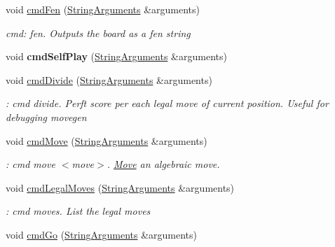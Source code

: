 \begin{DoxyCompactItemize}
void \hyperlink{classCommandEngine_ad6f3a8998e456a4efa626e32219e1406}{cmd\+Fen} (\hyperlink{structStringArguments}{String\+Arguments} \&arguments)
\begin{DoxyCompactList}\small\item\em cmd\+: fen. Outputs the board as a fen string \end{DoxyCompactList}\item 
\mbox{\label{classCommandEngine_a3c3140b31ac623d4b84611dfe954f3f0}} 
void {\bfseries cmd\+Self\+Play} (\hyperlink{structStringArguments}{String\+Arguments} \&arguments)
\item 
\mbox{\label{classCommandEngine_a1b1dfc2c6c5f0a161b68639b44798030}} 
void \hyperlink{classCommandEngine_a1b1dfc2c6c5f0a161b68639b44798030}{cmd\+Divide} (\hyperlink{structStringArguments}{String\+Arguments} \&arguments)
\begin{DoxyCompactList}\small\item\em \+: cmd divide. Perft score per each legal move of current position. Useful for debugging movegen \end{DoxyCompactList}\item 
\mbox{\label{classCommandEngine_ac508155eaada08bbab04d6644339fa87}} 
void \hyperlink{classCommandEngine_ac508155eaada08bbab04d6644339fa87}{cmd\+Move} (\hyperlink{structStringArguments}{String\+Arguments} \&arguments)
\begin{DoxyCompactList}\small\item\em \+: cmd move $<$move$>$. \hyperlink{structMove}{Move} an algebraic move. \end{DoxyCompactList}\item 
\mbox{\label{classCommandEngine_a2eec96165224a39d01c5c8803aec9dc6}} 
void \hyperlink{classCommandEngine_a2eec96165224a39d01c5c8803aec9dc6}{cmd\+Legal\+Moves} (\hyperlink{structStringArguments}{String\+Arguments} \&arguments)
\begin{DoxyCompactList}\small\item\em \+: cmd moves. List the legal moves \end{DoxyCompactList}\item 
\mbox{\label{classCommandEngine_a68d00effca283abfb561aacbad1977c9}} 
void \hyperlink{classCommandEngine_a68d00effca283abfb561aacbad1977c9}{cmd\+Go} (\hyperlink{structStringArguments}{String\+Arguments} \&arguments)

\end{DoxyCompactItemize}
